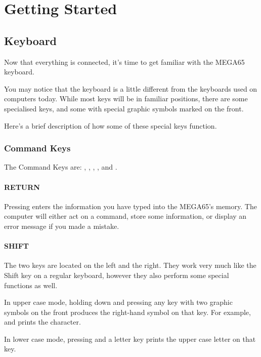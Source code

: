 \chapter{Getting Started}
\section{Keyboard}
\label{cha:getting-started}

Now that everything is connected, it's time to get familiar with the MEGA65 keyboard.

You may notice that the keyboard is a little different from the keyboards used on computers today. While most keys will be in familiar positions, there are some specialised keys, and some with special graphic symbols marked on the front.

Here's a brief description of how some of these special keys function.

\subsection{Command Keys}

The Command Keys are: , , , \megasymbolkey, and .

\subsubsection{RETURN}

Pressing  enters the information you have typed into the MEGA65's memory. The computer will either act on a command, store some information, or display an error message if you made a mistake.

\subsubsection{SHIFT}

The two  keys are located on the left and the right. They work very much like the Shift key on a regular keyboard, however they also perform some special functions as well.

In upper case mode, holding down  and pressing any key with two graphic symbols on the front produces the right-hand symbol on that key. For example,  and  prints the  character.

In lower case mode, pressing  and a letter key prints the upper case letter on that key.

